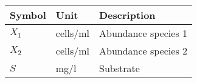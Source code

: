   \begin{tabular}{lll}\hline
    \textbf{Symbol} & \textbf{Unit} & \textbf{Description} \\ \hline
    $X_1$ & cells/ml & Abundance species 1 \\
    $X_2$ & cells/ml & Abundance species 2 \\
    $S$ & mg/l & Substrate \\ \hline
  \end{tabular}

